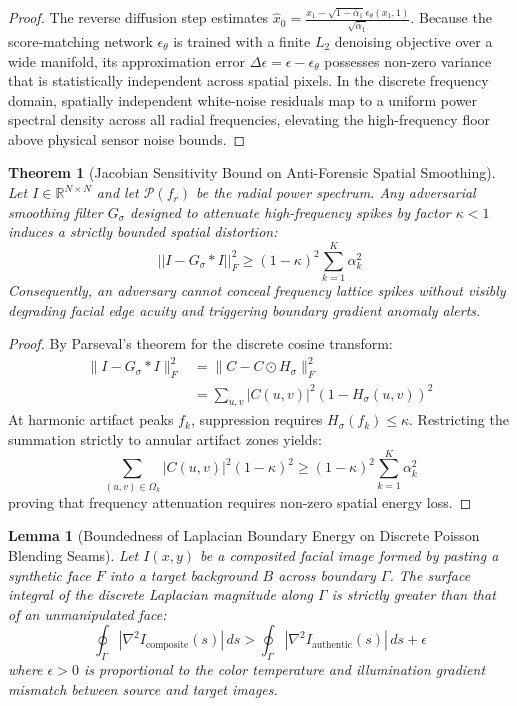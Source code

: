 \documentclass[journal]{IEEEtran}
\newtheorem{theorem}{Theorem}
\newtheorem{lemma}{Lemma}
\begin{document}
\begin{proof}
The reverse diffusion step estimates $\hat{x}_0 = \frac{x_1 - \sqrt{1 - \bar{\alpha}_1}\epsilon_\theta(x_1, 1)}{\sqrt{\bar{\alpha}_1}}$. Because the score-matching network $\epsilon_\theta$ is trained with a finite $L_2$ denoising objective over a wide manifold, its approximation error $\Delta \epsilon = \epsilon - \epsilon_\theta$ possesses non-zero variance that is statistically independent across spatial pixels. In the discrete frequency domain, spatially independent white-noise residuals map to a uniform power spectral density across all radial frequencies, elevating the high-frequency floor above physical sensor noise bounds.
\end{proof}

\begin{theorem}[Jacobian Sensitivity Bound on Anti-Forensic Spatial Smoothing]
Let $I \in \mathbb{R}^{N \times N}$ and let $\mathcal{P}(f_r)$ be the radial power spectrum. Any adversarial smoothing filter $G_\sigma$ designed to attenuate high-frequency spikes by factor $\kappa < 1$ induces a strictly bounded spatial distortion:
\begin{equation}
||I - G_\sigma * I||_F^2 \ge (1 - \kappa)^2 \sum_{k=1}^K \alpha_k^2
\end{equation}
Consequently, an adversary cannot conceal frequency lattice spikes without visibly degrading facial edge acuity and triggering boundary gradient anomaly alerts.
\end{theorem}

\begin{proof}
By Parseval's theorem for the discrete cosine transform:
\begin{align}
\|I - G_\sigma * I\|_F^2 &= \|C - C \odot H_\sigma\|_F^2 \nonumber \\
&= \sum_{u, v} |C(u, v)|^2 (1 - H_\sigma(u, v))^2
\end{align}
At harmonic artifact peaks $f_k$, suppression requires $H_\sigma(f_k) \le \kappa$. Restricting the summation strictly to annular artifact zones yields:
\begin{equation}
\sum_{(u, v) \in \Omega_k} |C(u, v)|^2 (1 - \kappa)^2 \ge (1 - \kappa)^2 \sum_{k=1}^K \alpha_k^2
\end{equation}
proving that frequency attenuation requires non-zero spatial energy loss.
\end{proof}

\begin{lemma}[Boundedness of Laplacian Boundary Energy on Discrete Poisson Blending Seams]
Let $I(x, y)$ be a composited facial image formed by pasting a synthetic face $F$ into a target background $B$ across boundary $\Gamma$. The surface integral of the discrete Laplacian magnitude along $\Gamma$ is strictly greater than that of an unmanipulated face:
\begin{equation}
\oint_{\Gamma} |\nabla^2 I_{\text{composite}}(s)| \, ds > \oint_{\Gamma} |\nabla^2 I_{\text{authentic}}(s)| \, ds + \epsilon
\end{equation}
where $\epsilon > 0$ is proportional to the color temperature and illumination gradient mismatch between source and target images.
\end{lemma}
\end{document}

